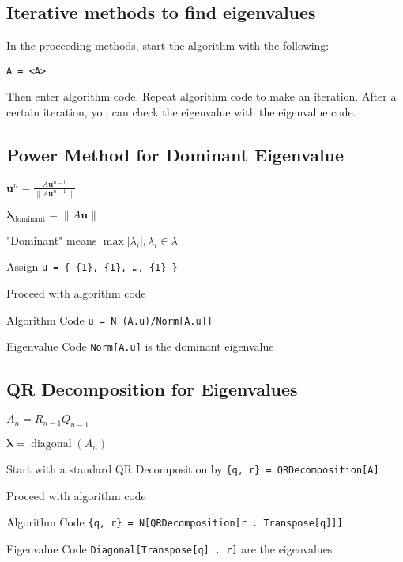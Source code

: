 \documentclass[10pt,letterpaper]{article}
\newenvironment{tight_item}
{\begin{itemize}
\setlength{\parskip}{0pt}
\setlength{\parsep}{0pt}
\setlength{\itemsep}{0pt}
\setlength{\parsep}{0pt}
\setlength{\topsep}{0pt}
\setlength{\partopsep}{0pt}
\setlength{\leftmargin}{0em}
\setlength{\labelwidth}{0em}
\setlength{\labelsep}{1em} }
{\end{itemize}}
\newenvironment{tight_enum}
{\begin{enumerate}
\setlength{\parskip}{0pt}
\setlength{\parsep}{0pt}
\setlength{\itemsep}{0pt}
\setlength{\parsep}{0pt}
\setlength{\topsep}{0pt}
\setlength{\partopsep}{0pt}
\setlength{\leftmargin}{0em}
\setlength{\labelwidth}{0em}
\setlength{\labelsep}{1em} }
{\end{enumerate}}
\newenvironment{tight_desc}
{\begin{description}
\setlength{\parskip}{0pt}
\setlength{\parsep}{0pt}
\setlength{\itemsep}{0pt}
\setlength{\parsep}{0pt}
\setlength{\topsep}{0pt}
\setlength{\partopsep}{0pt}
\setlength{\leftmargin}{0em}
\setlength{\labelwidth}{0em}
\setlength{\labelsep}{1em} }
{\end{description}}
\begin{document}
\begin{multicols*}{2}
\section{Iterative methods to find eigenvalues}
\begin{tight_item}
\item In the proceeding methods, start the algorithm with the following:
\begin{tight_enum}
\item \texttt{A = <A>}
\end{tight_enum}
Then enter algorithm code. Repeat algorithm code to make an iteration. After a
certain iteration, you can check the eigenvalue with the eigenvalue code.
\end{tight_item}

\subsection{Power Method for Dominant Eigenvalue}
\begin{tight_item}
\item $\mathbf{u}^{n} = \frac{A\textbf{u}^{n-1}}{\|A\textbf{u}^{n-1}\|}$
\item $ \mathbf{\lambda}_{\operatorname{dominant}} = \|A\mathbf{u} \| $
\item "Dominant" means $\max{ | \lambda_{i} | }, \lambda_{i} \in \lambda$
\end{tight_item}
\begin{tight_enum}
\item Assign \texttt{u = \{ \{1\}, \{1\}, \ldots, \{1\} \}}
\item Proceed with algorithm code
\end{tight_enum}
\begin{tight_desc}
\item[Algorithm Code]\texttt{u = N[(A.u)/Norm[A.u]]}
\item[Eigenvalue Code] \texttt{Norm[A.u]} is the dominant eigenvalue
\end{tight_desc}


\subsection{QR Decomposition for Eigenvalues}
\begin{tight_item}
\item $A_{n} = R_{n-1} Q_{n-1}$
\item $ \mathbf{\lambda} = \operatorname{diagonal}(A_{n})$
\end{tight_item}
\begin{tight_enum}
\item Start with a standard QR Decomposition by \texttt{\{q, r\} = QRDecomposition[A]}
\item Proceed with algorithm code
\end{tight_enum}
\begin{tight_desc}
\item[Algorithm Code]\texttt{\{q, r\} = N[QRDecomposition[r . Transpose[q]]]}
\item[Eigenvalue Code] \texttt{Diagonal[Transpose[q] . r]} are the eigenvalues
\end{tight_desc}

\end{multicols*}
\end{document}
